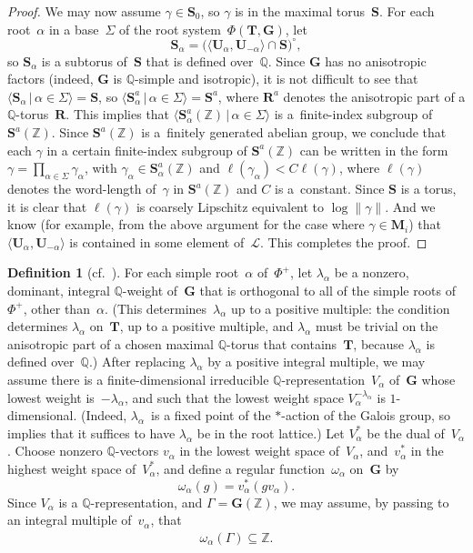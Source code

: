 \documentclass[11pt]{article}
\numberwithin{equation}{section}
\newcommand{\QQ}{\mathbb{Q}}
\newcommand{\ZZ}{\mathbb{Z}}
\newcommand{\Ga}{\mathbf{G}}
\newcommand{\Ma}{\mathbf{M}}
\newcommand{\Ra}{\mathbf{R}}
\newcommand{\Sa}{\mathbf{S}}
\newcommand{\Ta}{\mathbf{T}}
\newcommand{\Ua}{\mathbf{U}}
\newcommand{\subgroups}{\mathcal{L}}
\numberwithin{equation}{section}
\theoremstyle{definition}
\newtheorem{defn}[thm]{Definition}
\begin{document}
\begin{proof}
We may now assume $\gamma \in \Sa_0$, so $\gamma$ is in the maximal torus~$\Sa$.
For each root~$\alpha$ in a base~$\Sigma$ of the root system~$\Phi(\Ta, \Ga)$, let
	\[\Sa_\alpha = \bigl( \langle \Ua_\alpha, \Ua_{-\alpha} \rangle \cap \Sa \bigr)^\circ , \]
so $\Sa_\alpha$ is a subtorus of~$\Sa$ that is defined over~$\QQ$. Since $\Ga$ has no anisotropic factors (indeed, $\Ga$ is $\QQ$-simple and isotropic), it is not difficult to see that
	$\langle \Sa_\alpha \,|\, \alpha \in \Sigma \rangle = \Sa$,
so
	$\langle \Sa_\alpha^a \,|\, \alpha \in \Sigma \rangle = \Sa^a$,
where $\Ra^a$ denotes the anisotropic part of a $\QQ$-torus~$\Ra$.
This implies that
	$\langle \Sa_\alpha^a(\ZZ) \,|\, \alpha \in \Sigma \rangle$ is a~finite-index subgroup of~$\Sa^a(\ZZ)$.
Since $\Sa^a(\ZZ)$ is a~finitely generated abelian group, we conclude that each $\gamma$ in a certain finite-index subgroup of $\Sa^a(\ZZ)$ can be written in the form
	$\gamma = \prod\limits_{\alpha \in \Sigma} \gamma_\alpha$,
with $\gamma_\alpha \in \Sa_\alpha^a(\ZZ)$ and $\ell(\gamma_\alpha) < C \ell(\gamma)$, where $\ell(\gamma)$ denotes the word-length of~$\gamma$ in $\Sa^a(\ZZ)$ and $C$ is a~constant. Since $\Sa$ is a torus, it is clear that $\ell(\gamma)$ is coarsely Lipschitz equivalent to $\log \|\gamma\|$. And we know (for example, from the above argument for the case where $\gamma \in \Ma_i$) that $\langle \Ua_\alpha, \Ua_{-\alpha} \rangle$ is contained in some element of~$\subgroups$. This completes the proof.
\end{proof}

\begin{defn}[cf.\ {\cite[p.~44]{MR1828742}}] \label{omegaDefn}
For each simple root~$\alpha$ of~$\Phi^+$, let $\lambda_\alpha$ be a nonzero, dominant, integral $\QQ$-weight of~$\Ga$ that is orthogonal to all of the simple roots of~$\Phi^+$, other than~$\alpha$. (This determines~$\lambda_\alpha$ up to a positive multiple: the condition determines $\lambda_\alpha$ on~$\Ta$, up to a positive multiple, and $\lambda_\alpha$ must be trivial on the anisotropic part of a chosen maximal $\QQ$-torus that contains~$\Ta$, because $\lambda_\alpha$ is defined over~$\QQ$.) After replacing $\lambda_\alpha$ by a positive integral multiple, we may assume there is a finite-dimensional irreducible $\QQ$-representation~$V_\alpha$ of~$\Ga$ whose lowest weight is~$-\lambda_\alpha$, and such that the lowest weight space $V_\alpha^{-\lambda_\alpha}$ is $1$-dimensional. (Indeed, $\lambda_\alpha$~is a fixed point of the $*$-action of the Galois group, so \cite[Theorem~3.3]{MR0277536} implies that it suffices to have $\lambda_\alpha$ be in the root lattice.)
Let $V_\alpha^*$ be the dual of~$V_\alpha$. Choose nonzero $\QQ$-vectors $v_\alpha$ in the lowest weight space of~$V_\alpha$, and~$v_\alpha^*$ in the highest weight space of~$V_\alpha^*$, and define a regular function~$\omega_\alpha$ on~$\Ga$ by
	\[ \omega_\alpha(g) = v_\alpha^*( g v_\alpha) .\]
Since $V_\alpha$ is a $\QQ$-representation, and $\Gamma = \Ga(\ZZ)$, we may assume, by passing to an integral multiple of~$v_\alpha$, that
	\begin{gather} \label{omega(Gamma)}
	 \omega_\alpha(\Gamma) \subseteq \ZZ
	. \end{gather}
\end{defn}
\end{document}
